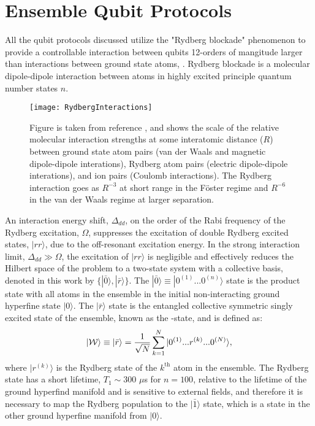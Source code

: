\section{Ensemble Qubit Protocols}
All the qubit protocols discussed utilize the "Rydberg blockade" phenomenon to provide a controllable interaction between qubits 12-orders of mangitude larger than interactions between ground state atoms\cite{SaffmanWalkerMolmer2010}, .
Rydberg blockade is a molecular dipole-dipole interaction between atoms in highly excited principle quantum number states $n$.
\begin{figure}
  \centering
  \label{fig_rydinteract}
  \texttt{[image: RydbergInteractions]}
  \caption{
    Figure is taken from reference \cite{SaffmanWalkerMolmer2010}, and shows the scale of the relative molecular interaction strengths at some interatomic distance ($R$) between ground state atom pairs (van der Waals and magnetic dipole-dipole interations), Rydberg atom pairs (electric dipole-dipole interations), and ion pairs (Coulomb interactions).
    The Rydberg interaction goes as $R^{-3}$ at short range in the F\"{o}ster regime and $R^{-6}$ in the van der Waals regime at larger separation.
  }
\end{figure}
An interaction energy shift, $\Delta_{dd}$, on the order of the Rabi frequency of the Rydberg excitation, $\Omega$, suppresses the excitation of double Rydberg excited states, $|rr\rangle$, due to the off-resonant excitation energy.
In the strong interaction limit, $\Delta_{dd} \gg \Omega$, the excitation of $|rr\rangle$ is negligible and effectively reduces the Hilbert space of the problem to a two-state system with a collective basis, denoted in this work by $\{|\bar{0}\rangle,|\bar{r}\rangle\}$.
The $|\bar{0}\rangle\equiv|0^{(1)}...0^{(n)}\rangle$ state is the product state with all atoms in the ensemble in the initial non-interacting ground hyperfine state $|0\rangle$.
The $|\bar{r}\rangle$ state is the entangled collective symmetric singly excited state of the ensemble, known as the \W{}-state\cite{DuerVidalCirac2000}, and is defined as:
\begin{equation}
  \label{eq_wstate}
  |\mathcal{W}{}\rangle \equiv |\bar{r}\rangle = \frac{1}{\sqrt{N}}\sum_{k=1}^{N}|0^{(1)}...r^{(k)}...0^{(N)}\rangle,
\end{equation}
where $|r^{(k)}\rangle$ is the Rydberg state of the $k^{\mathrm{th}}$ atom in the ensemble.
The Rydberg state has a short lifetime, $T_1\sim300$ $\mu$s for $n=100$\cite{SaffmanWalkerMolmer2010}, relative to the lifetime of the ground hyperfind manifold and is sensitive to external fields, and therefore it is necessary to map the Rydberg population to the $|\bar{1}\rangle$ state, which is a state in the other ground hyperfine manifold from $|0\rangle$.

